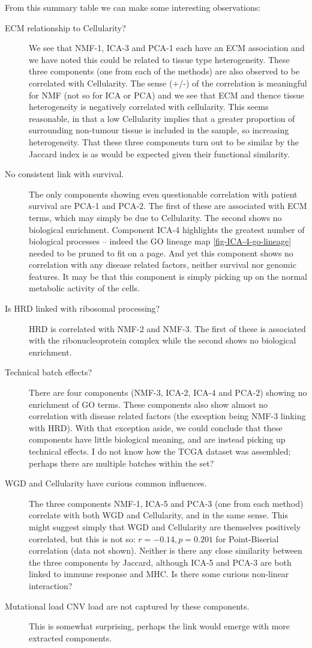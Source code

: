 \documentclass[tikz, 12pt,a4paper,oneside,fleqn]{article}
\begin{document}
From this summary table we can make some interesting observations:
\begin{description}
\item[ECM relationship to Cellularity?]
We see that NMF-1, ICA-3 and PCA-1 each have an ECM association and we have noted this could be related to tissue type heterogeneity.   These three components (one from each of the methods) are also observed to be correlated with Cellularity.  The sense (+/-) of the correlation is meaningful for NMF (not so for ICA or PCA) and we see that ECM and thence tissue heterogeneity is negatively correlated with cellularity. This seems reasonable, in that a low Cellularity implies that a greater proportion of surrounding non-tumour tissue is included in the sample, so increasing heterogeneity.   That these three components turn out to be similar by the Jaccard index is as would be expected given their functional similarity.
\item[No consistent link with survival.]
The only components showing even questionable correlation with patient survival are  PCA-1 and PCA-2.  The first of these are associated with ECM terms, which may simply be due to Cellularity.  The second shows no biological enrichment.
Component ICA-4 highlights the greatest number of biological processes -- indeed the GO lineage map \ref{fig-ICA-4-go-lineage} needed to be pruned to fit on a page.  And yet this component shows no correlation with any disease related factors, neither survival nor genomic features.  It may be that this component is simply picking up on the normal metabolic activity of the cells.
\item[Is HRD linked with ribosomal processing?]  HRD is correlated with NMF-2 and NMF-3.  The first of these is associated with the ribonucleoprotein complex while the second shows no biological enrichment.
\item[Technical batch effects?]
There are four components (NMF-3, ICA-2, ICA-4 and PCA-2) showing no enrichment of GO terms.  These components also show almost no correlation with disease related factors (the exception being NMF-3 linking with HRD).  With that exception aside, we could conclude that these components have little biological meaning, and are instead picking up technical effects.  I do not know how the TCGA dataset was assembled; perhaps there are multiple batches within the set?
\item[WGD and Cellularity have curious common influences.]
The three components NMF-1, ICA-5 and PCA-3 (one from each method) correlate with both WGD and Cellularity, and in the same sense. 
This might suggest simply that WGD and Cellularity are themselves positively correlated, but this is not so: $r=-0.14, p=0.201$ for Point-Biserial correlation (data not shown).  Neither is there any close similarity between the three components by Jaccard, although ICA-5 and PCA-3 are both linked to immune response and MHC.   Is there some curious non-linear interaction?
\item[Mutational load CNV load are not captured by these components.]  This is somewhat surprising, perhaps the link would emerge with more extracted components.
\end{description} 
\end{document}
